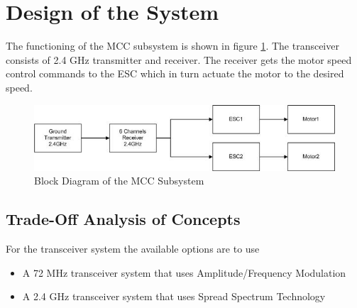 \section{Design of the System}

The functioning of the MCC subsystem is shown in figure \ref{fig:design_block}. The transceiver consists of 2.4 GHz transmitter and receiver. The receiver gets the motor speed control commands to the ESC which in turn actuate the motor to the desired speed.

\begin{figure}[bht]
\centering
\includegraphics[scale=0.8]{figures/blockdiagram.jpg}
\caption{Block Diagram of the MCC Subsystem}
\label{fig:design_block}
\end{figure}





\subsection{Trade-Off Analysis of Concepts}

For the transceiver system the available options are to use
\begin{itemize}
\item A 72 MHz transceiver system that uses Amplitude/Frequency Modulation
\item A 2.4 GHz transceiver system that uses Spread Spectrum Technology
\end{itemize}

